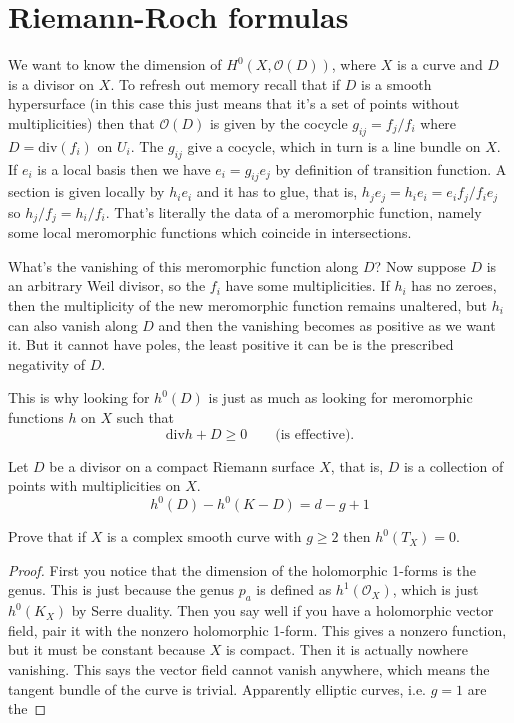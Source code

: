 \documentclass{book}
\begin{document}
\section{Riemann-Roch formulas}
\label{section-riemann-roch}

\noindent
We want to know the dimension of
$H^0(X,\mathcal{O}(D))$,
where $X$ is a curve and $D$ is a divisor on
$X$.
To refresh out memory recall that if $D$ is a
smooth hypersurface
(in this case this just means that it's a set
of points
without multiplicities)
then that $\mathcal{O}(D)$ is given by the
cocycle
$g_{ij}=f_j/f_i$ where $D=\text{div}(f_i)$ on
$U_i$.
The $g_{ij}$ give a cocycle, which in turn is
a line bundle on $X$.
If $e_i$ is a local basis then we have
$e_i=g_{ij}e_j$
by definition of transition function.
A section is given locally by $h_ie_i$ and it
has to glue,
that is, $h_je_j=h_ie_i=e_if_j/f_ie_j$
so $h_j/f_j=h_i/f_i$.
That's literally the data of a meromorphic
function,
namely some local meromorphic functions which
coincide in intersections.

What's the vanishing of this meromorphic
function along $D$?
Now suppose $D$ is an arbitrary Weil divisor,
so the $f_i$ have some multiplicities.
If $h_i$ has no zeroes, then the multiplicity
of the new
meromorphic function remains unaltered, but
$h_i$ can also vanish
along $D$ and then the vanishing becomes as
positive as we want it.
But it cannot have poles, the least positive
it can be is
the prescribed negativity of $D$.

This is why looking for $h^0(D)$ is just as
much as looking for
meromorphic functions $h$ on $X$ such that
$$
\text{div}h + D \geq 0\qquad \text{(is
effective).}
$$



\begin{theorem}
\label{theorem-Riemann-Roch-for-curves}
Let $D$ be a divisor on a compact Riemann
surface $X$, that is, $D$ is a
collection of points with multiplicities on
$X$.
\begin{equation}
\label{equation-riema-roch-riema-surfa}
h^0(D)-h^0(K-D)=d-g+1
\end{equation}
\end{theorem}

\begin{exercise}
\label{exercise-no-holom-vecto-field-g}
Prove that if $X$ is a complex smooth curve
with $g\geq 2$ then $h^0(T_X)=0$.
\end{exercise}

\begin{proof}
First you notice that the dimension of the
holomorphic 1-forms is the genus.
This is just because the genus $p_a$ is
defined as $h^1(\mathcal{O}_X)$, which
is just $h^0(K_X)$ by Serre duality. Then you
say well if you have a holomorphic
vector field, pair it with the nonzero
holomorphic 1-form. This gives a nonzero
function, but it must be constant because $X$
is compact. Then it is actually
nowhere vanishing. This says the vector field
cannot vanish anywhere, which
means the tangent bundle of the curve is
trivial. Apparently elliptic curves,
i.e. $g=1$ are the
\end{proof}
\end{document}
